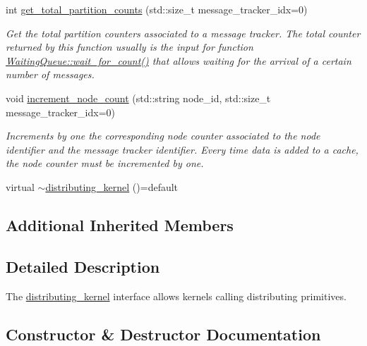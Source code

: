 \begin{DoxyCompactItemize}
int \hyperlink{classral_1_1cache_1_1distributing__kernel_ae5f1a597fc3716c344b54b6d0d6af311}{get\+\_\+total\+\_\+partition\+\_\+counts} (std\+::size\+\_\+t message\+\_\+tracker\+\_\+idx=0)
\begin{DoxyCompactList}\small\item\em Get the total partition counters associated to a message tracker. The total counter returned by this function usually is the input for function \hyperlink{classral_1_1cache_1_1WaitingQueue_abd7d9824f1b89ead2c937e1c6d64ba4f}{Waiting\+Queue\+::wait\+\_\+for\+\_\+count()} that allows waiting for the arrival of a certain number of messages. \end{DoxyCompactList}\item 
void \hyperlink{classral_1_1cache_1_1distributing__kernel_a304a30bf1847aab1dd6a9779bbc80929}{increment\+\_\+node\+\_\+count} (std\+::string node\+\_\+id, std\+::size\+\_\+t message\+\_\+tracker\+\_\+idx=0)
\begin{DoxyCompactList}\small\item\em Increments by one the corresponding node counter associated to the node identifier and the message tracker identifier. Every time data is added to a cache, the node counter must be incremented by one. \end{DoxyCompactList}\item 
virtual \hyperlink{classral_1_1cache_1_1distributing__kernel_a19afe37abf9e6a2f29f2a83d45ecf093}{$\sim$distributing\+\_\+kernel} ()=default
\end{DoxyCompactItemize}
\subsection*{Additional Inherited Members}


\subsection{Detailed Description}
The \hyperlink{classral_1_1cache_1_1distributing__kernel}{distributing\+\_\+kernel} interface allows kernels calling distributing primitives. 

\subsection{Constructor \& Destructor Documentation}
\mbox{\label{classral_1_1cache_1_1distributing__kernel_a7dd5d1d4ee0081e8570a893209d3c4bf}} 
